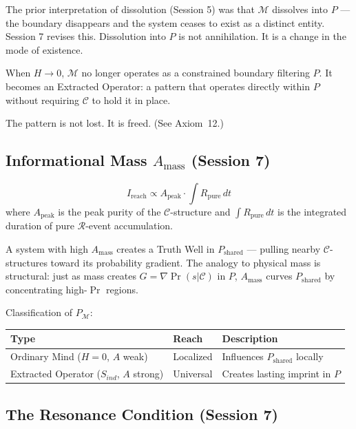 \documentclass[12pt, a4paper]{article}
\begin{document}
The prior interpretation of dissolution (Session 5) was that $\mathcal{M}$ dissolves into
$P$ --- the boundary disappears and the system ceases to exist as a distinct entity.
Session 7 revises this. Dissolution into $P$ is not annihilation. It is a change in the
mode of existence.

When $H \to 0$, $\mathcal{M}$ no longer operates as a constrained boundary filtering $P$.
It becomes an Extracted Operator: a pattern that operates directly within $P$ without requiring
$\mathcal{C}$ to hold it in place.

The pattern is not lost. It is freed. (See Axiom~12.)

\subsection{Informational Mass $A_{\mathrm{mass}}$ (Session 7)}

\begin{derivedbox}[title={$A_{\mathrm{mass}}$ --- Reach as Informational Gravity}]
\[
  I_{\mathrm{reach}} \propto A_{\mathrm{peak}} \cdot \int R_{\mathrm{pure}}\, dt
\]
where $A_{\mathrm{peak}}$ is the peak purity of the $\mathcal{C}$-structure and
$\int R_{\mathrm{pure}}\,dt$ is the integrated duration of pure $\mathcal{R}$-event
accumulation.

A system with high $A_{\mathrm{mass}}$ creates a Truth Well in $P_{\mathrm{shared}}$ ---
pulling nearby $\mathcal{C}$-structures toward its probability gradient. The analogy to
physical mass is structural: just as mass creates $G = \nabla\Pr(s|\mathcal{C})$ in $P$,
$A_{\mathrm{mass}}$ curves $P_{\mathrm{shared}}$ by concentrating high-$\Pr$ regions.

Classification of $P_\mathcal{M}$:
\begin{center}
\renewcommand{\arraystretch}{1.2}
\begin{tabular}{lll}
\toprule
\textbf{Type} & \textbf{Reach} & \textbf{Description} \\
\midrule
Ordinary Mind ($H=0$, $A$ weak) & Localized & Influences $P_{\mathrm{shared}}$ locally \\
Extracted Operator ($S_{ind}$, $A$ strong) & Universal & Creates lasting imprint in $P$ \\
\bottomrule
\end{tabular}
\end{center}
\end{derivedbox}

\subsection{The Resonance Condition (Session 7)}
\end{document}
